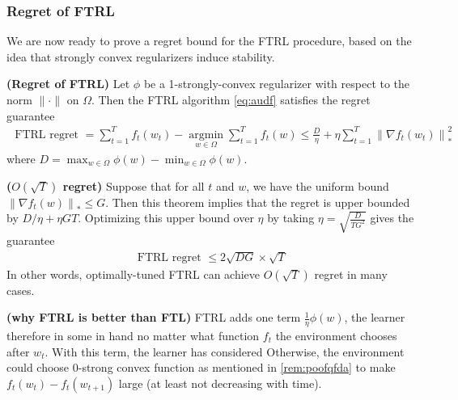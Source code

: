 \documentclass{article}
\newcommand{\bfs}[1]{\textbf{({#1}) }}
\begin{document}
\subsubsection{Regret of FTRL}
We are now ready to prove a regret bound for the FTRL procedure, based on the idea that strongly convex regularizers induce stability.

\begin{thma}\bfs{Regret of FTRL}\label{thm:trhfsreq}
 Let $\phi$ be a 1-strongly-convex regularizer with respect to the norm $\|\cdot\|$ on $\Omega$. Then the FTRL algorithm \cref{eq:audf} satisfies the regret guarantee
\begin{align*}
\text { FTRL regret }=\sum_{t=1}^{T} f_{t}\left(w_{t}\right)-\underset{w \in \Omega}{\operatorname{argmin}} \sum_{t=1}^{T} f_{t}(w) \leq \frac{D}{\eta}+\eta \sum_{t=1}^{T}\left\|\nabla f_{t}\left(w_{t}\right)\right\|_{*}^{2}
\end{align*}
where $D=\max _{w \in \Omega} \phi(w)-\min _{w \in \Omega} \phi(w)$.
\end{thma}
\begin{rema}\bfs{$O(\sqrt{T})$ regret}
 Suppose that for all $t$ and $w$, we have the uniform bound $\left\|\nabla f_{t}(w)\right\|_{*} \leq G$. Then this theorem implies that the regret is upper bounded by $D / \eta+\eta G T$. Optimizing this upper bound over $\eta$ by taking $\eta=\sqrt{\frac{D}{T G^{2}}}$ gives the guarantee
\begin{align}
\text { FTRL regret } \leq 2 \sqrt{D G} \times \sqrt{T}\label{eq:mhgasdf}
\end{align}
In other words, optimally-tuned FTRL can achieve $O(\sqrt{T})$ regret in many cases.
\end{rema}
\begin{rema}\bfs{why FTRL is better than FTL}
 FTRL adds one term $\frac{1}{\eta} \phi(w)$, the learner therefore in some  in hand no matter what function $f_t$ the environment chooses after $w_t$. With this term, the learner has considered  Otherwise, the environment could choose $0$-strong convex function as mentioned in \cref{rem:poofqfda} to make $f_{t}\left(w_{t}\right)-f_{t}\left(w_{t+1}\right)$ large (at least not decreasing with time).
\end{rema}
\end{document}
